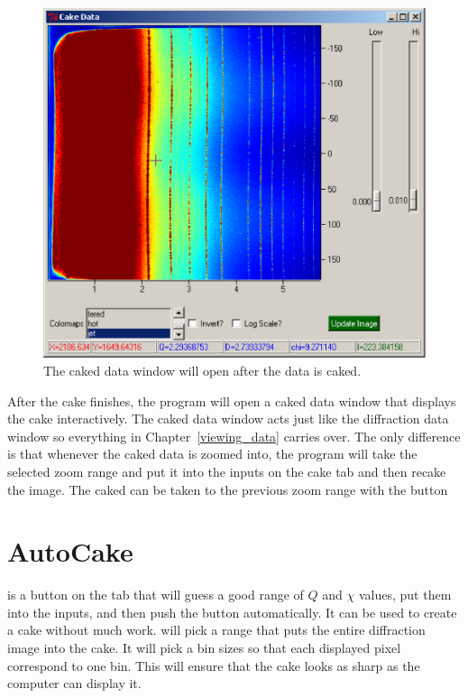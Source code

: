 \begin{figure}
    \centering
    \includegraphics[scale=.75]{figures/cake_data_window.eps}
    \caption{The caked data window will open after the
    data is caked.} 
    \label{cake_data_window}
\end{figure}

After the cake finishes, the program will open a caked data
window that displays the cake interactively.
The caked data window acts just like the diffraction
data window so everything in Chapter~\ref{viewing_data} 
carries over. The only difference is that whenever
the caked data is zoomed into, the program will take
the selected zoom range and put it into the inputs on
the cake tab and then recake the image. The caked 
can be taken to the previous zoom range with the 
 button 

\section{AutoCake}

 is a button on the  tab that 
will guess a good range of $Q$ and $\chi$ 
values, put them into the inputs, and then push the 
 button automatically. It can be used to
create a cake without much work.  will pick a range
that puts the entire diffraction image into the cake. It will pick
a bin sizes so that each displayed pixel correspond to one bin. 
This will ensure that the cake looks as sharp as the computer 
can display it.

